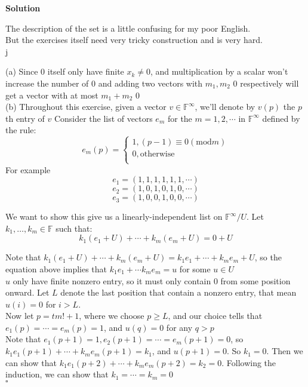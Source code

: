 \documentclass{article}
\newenvironment{solution}{%
{
    \textbf{Solution\\}
    }
}{
  \hfill $\square$ 
  \par\bigskip 
}
\newcommand{\FF}{\mathbb{F}}
\begin{document}
\begin{CJK}{UTF8}{gkai}
\begin{solution}
    The description of the set is a little confusing for my poor English.\\

    But the exercises itself need very tricky construction and is very hard.\\j

    (a) Since $0$ itself only have finite $x_k \neq 0$, and multiplication by a scalar won't increase the number of $0$ and adding two vectors with $m_1,m_2$ $0$ respectively will get a vector with at most $m_1 + m_2$ $0$\\
    
    (b) Throughout this exercise, given a vector $v \in \FF^\infty$, we'll denote by $v(p)$ the $p$ th entry of $v$ Consider the list of vectors $e_m$ for the $m = 1,2,\cdots$ in $\FF^\infty$ defined by the rule:
    \[e_m(p) = 
    \begin{cases}
        1, (p-1)\equiv 0(\text{mod} m)\\
        0, \text{otherwise}\\
    \end{cases}\] 
    For example
    \[e_1 = (1,1,1,1,1,1,\cdots)\]
    \[e_2 = (1,0,1,0,1,0,\cdots)\]
    \[e_3 = (1,0,0,1,0,0,\cdots)\]

    We want to show this give us a linearly-independent list on $\FF^\infty/U$. Let $k_1,\ldots,k_m \in \FF$ such that:
    \[k_1(e_1 + U) + \cdots + k_m(e_m + U) = 0 + U\]

    Note that $k_1(e_1 + U) + \cdots + k_m(e_m + U) = k_1e_1 + \cdots + k_m e_m + U$, so the equation above implies that $k_1 e_1 + \cdots k_m e_m = u$ for some $u \in U$\\

    $u$ only have finite nonzero entry, so it must only contain $0$ from some position onward. Let $L$ denote the last position that contain a nonzero entry, that mean $u(i) = 0$ for $i > L$.\\

    Now let $ p =t m ! + 1$, where we choose $p \geq L$, and our choice tells that $e_1(p) = \cdots = e_m(p) = 1$, and $u(q) = 0$ for any $q > p$\\

    Note that $e_1(p + 1) = 1, e_2(p + 1) = \cdots = e_m(p + 1)= 0$, so $k_1e_1(p + 1) + \cdots + k_m e_m(p + 1) = k_1 $, and $u(p + 1) = 0$. So $k_1 = 0$. Then we can show that $k_1e_1(p + 2) + \cdots + k_m e_m(p + 2) = k_2 = 0$. Following the induction, we can show that $k_1 = \cdots = k_m = 0$\\


\end{solution}
\end{CJK}
\end{document}
